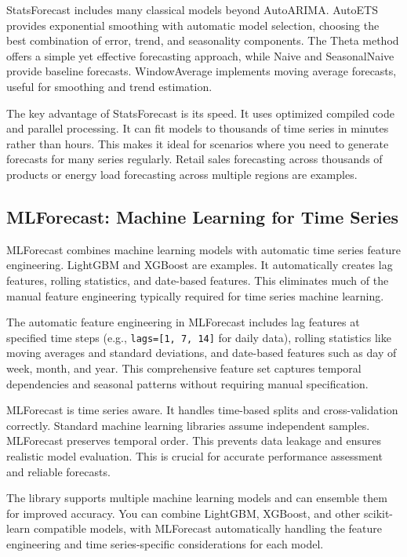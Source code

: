 StatsForecast includes many classical models beyond AutoARIMA. AutoETS provides exponential smoothing with automatic model selection, choosing the best combination of error, trend, and seasonality components. The Theta method offers a simple yet effective forecasting approach, while Naive and SeasonalNaive provide baseline forecasts. WindowAverage implements moving average forecasts, useful for smoothing and trend estimation.

The key advantage of StatsForecast is its speed. It uses optimized compiled code and parallel processing. It can fit models to thousands of time series in minutes rather than hours. This makes it ideal for scenarios where you need to generate forecasts for many series regularly. Retail sales forecasting across thousands of products or energy load forecasting across multiple regions are examples.

\subsection{MLForecast: Machine Learning for Time Series}

MLForecast combines machine learning models with automatic time series feature engineering. LightGBM and XGBoost are examples. It automatically creates lag features, rolling statistics, and date-based features. This eliminates much of the manual feature engineering typically required for time series machine learning.

The automatic feature engineering in MLForecast includes lag features at specified time steps (e.g., \texttt{lags=[1, 7, 14]} for daily data), rolling statistics like moving averages and standard deviations, and date-based features such as day of week, month, and year. This comprehensive feature set captures temporal dependencies and seasonal patterns without requiring manual specification.

MLForecast is time series aware. It handles time-based splits and cross-validation correctly. Standard machine learning libraries assume independent samples. MLForecast preserves temporal order. This prevents data leakage and ensures realistic model evaluation. This is crucial for accurate performance assessment and reliable forecasts.

The library supports multiple machine learning models and can ensemble them for improved accuracy. You can combine LightGBM, XGBoost, and other scikit-learn compatible models, with MLForecast automatically handling the feature engineering and time series-specific considerations for each model.

